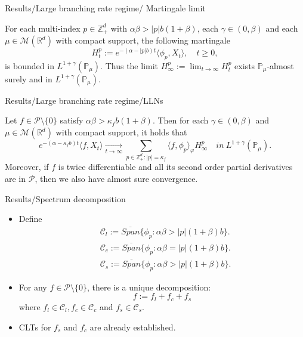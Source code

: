 \documentclass[xcolor=dvipsnames]{beamer}
\begin{document}
\begin{frame}{Results/Large branching rate regime/ Martingale limit}
\begin{lemma}
	For each multi-index $p\in \mathbb Z_+^d$ with $\alpha \beta > |p|b(1+\beta)$, each $\gamma \in (0,\beta)$ and each $\mu \in \mathcal M(\mathbb R^d)$ with compact support, the following martingale
\[
	H_t^p:= e^{-(\alpha-|p|b) t} \langle \phi_p, X_t\rangle, \quad t\geq 0,
\]
	is bounded in $L^{1+\gamma}(\mathbb P_\mu)$. 
	Thus the limit $H_\infty^p:= \lim_{t\to \infty} H_t^p$ exists $\mathbb P_\mu$-almost surely and in $L^{1+\gamma}(\mathbb P_\mu)$.
\end{lemma}
\end{frame}

\begin{frame}{Results/Large branching rate regime/LLNs}
\begin{theorem}
	Let $f \in \mathcal{P}\setminus\{0\}$ satisfy $\alpha\beta>\kappa_fb(1+\beta)$. 
	Then for each $\gamma\in (0, \beta)$ and $\mu\in \mathcal M(\mathbb R^d)$ with compact support, it holds that
\[
    e^{-(\alpha-\kappa_fb)t}\langle f, X_t\rangle
       \xrightarrow[t\to \infty]{}\sum_{p\in \mathbb Z_+^d:|p|=\kappa_f}\langle f, \phi_p\rangle_{\varphi} H_{\infty}^p
    \quad in~ L^{1+\gamma}(\mathbb{P}_{\mu}).
\]
    Moreover, if $f$ is twice differentiable and all its second order partial derivatives are in $\mathcal{P}$, then we also have almost sure convergence.
\end{theorem}
\end{frame}

\begin{frame}{Results/Spectrum decomposition}
\begin{itemize}
\item
	Define
\begin{align}
	&\mathcal{C}_l
   :=\overline{Span}\{\phi_p: \alpha\beta>|p|(1+\beta)b \}.
	\\ &\mathcal{C}_c
  :=\overline{Span}\{\phi_p: \alpha\beta=|p|(1+\beta)b \}.
	\\&\mathcal{C}_s
  :=\overline{Span}\{\phi_p: \alpha\beta >|p|(1+\beta)b \}.
\end{align}
\item
	For any $f\in \mathcal P\setminus\{0\}$, there is a unique decomposition: 
\[
	f := f_l + f_c + f_s
\]
	where $f_l \in \mathcal C_l, f_c\in \mathcal C_c$ and $f_s\in \mathcal C_s$.
\item
	CLTs for $f_s$ and $f_c$ are already established.
\end{itemize}
\end{frame}
\end{document}
